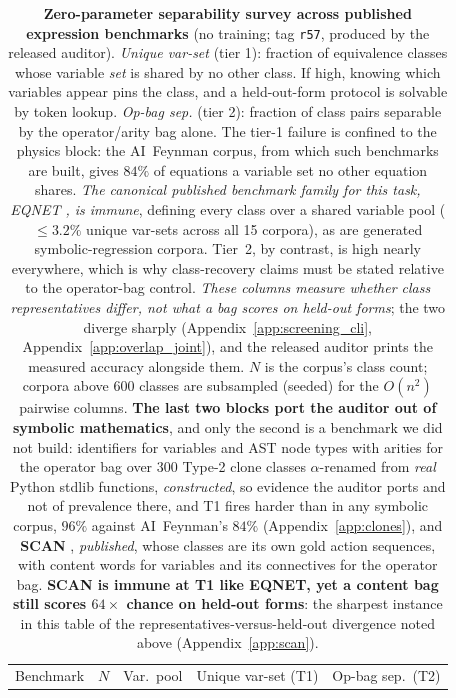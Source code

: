 \begin{table}[t]
\centering
\caption{\textbf{Zero-parameter separability survey across published expression benchmarks} (no training; tag \texttt{r57}, produced by the released auditor). \emph{Unique var-set} (tier 1): fraction of equivalence classes whose variable \emph{set} is shared by no other class. If high, knowing which variables appear pins the class, and a held-out-form protocol is solvable by token lookup. \emph{Op-bag sep.} (tier 2): fraction of class pairs separable by the operator/arity bag alone. The tier-1 failure is confined to the physics block: the AI~Feynman corpus, from which such benchmarks are built, gives $84\%$ of equations a variable set no other equation shares. \emph{The canonical published benchmark family for this task, EQNET \citep{allamanis2017learning}, is immune}, defining every class over a shared variable pool ($\leq 3.2\%$ unique var-sets across all 15 corpora), as are generated symbolic-regression corpora. Tier~2, by contrast, is high nearly everywhere, which is why class-recovery claims must be stated relative to the operator-bag control. \emph{These columns measure whether class representatives differ, not what a bag scores on held-out forms}; the two diverge sharply (Appendix~\ref{app:screening_cli}, Appendix~\ref{app:overlap_joint}), and the released auditor prints the measured accuracy alongside them. $N$ is the corpus's class count; corpora above $600$ classes are subsampled (seeded) for the $O(n^2)$ pairwise columns. \textbf{The last two blocks port the auditor out of symbolic mathematics}, and only the second is a benchmark we did not build: identifiers for variables and AST node types with arities for the operator bag over $300$ Type-2 clone classes $\alpha$-renamed from \emph{real} Python stdlib functions, \emph{constructed}, so evidence the auditor ports and not of prevalence there, and T1 fires harder than in any symbolic corpus, $96\%$ against AI~Feynman's $84\%$ (Appendix~\ref{app:clones}), and \textbf{SCAN} \citep{lake2018generalization}, \emph{published}, whose classes are its own gold action sequences, with content words for variables and its connectives for the operator bag. \textbf{SCAN is immune at T1 like EQNET, yet a content bag still scores $64\times$ chance on held-out forms}: the sharpest instance in this table of the representatives-versus-held-out divergence noted above (Appendix~\ref{app:scan}).}
\label{tab:benchmark_survey}
\small
\setlength{\tabcolsep}{4pt}
\begin{tabular}{l r r r r}
\toprule
Benchmark & $N$ & Var.\ pool & Unique var-set (T1) & Op-bag sep.\ (T2) \\

\end{tabular}
\end{table}
